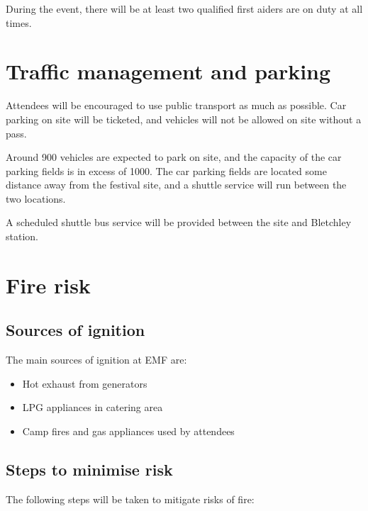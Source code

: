 During the event, there will be at least two qualified first aiders are on duty at all times.

\section{Traffic management and parking}

Attendees will be encouraged to use public transport as much as possible. Car parking on site will be ticketed, and vehicles will not be allowed on site without a pass.

Around 900 vehicles are expected to park on site, and the capacity of the car parking fields is in excess of 1000.
The car parking fields are located some distance away from the festival site, and a shuttle service will run between
the two locations.

A scheduled shuttle bus service will be provided between the site and Bletchley station.
\section{Fire risk}
\subsection{Sources of ignition}

The main sources of ignition at EMF are:

\begin{itemize}
\item Hot exhaust from generators
\item LPG appliances in catering area
\item Camp fires and gas appliances used by attendees
\end{itemize}

\subsection{Steps to minimise risk}
The following steps will be taken to mitigate risks of fire:

